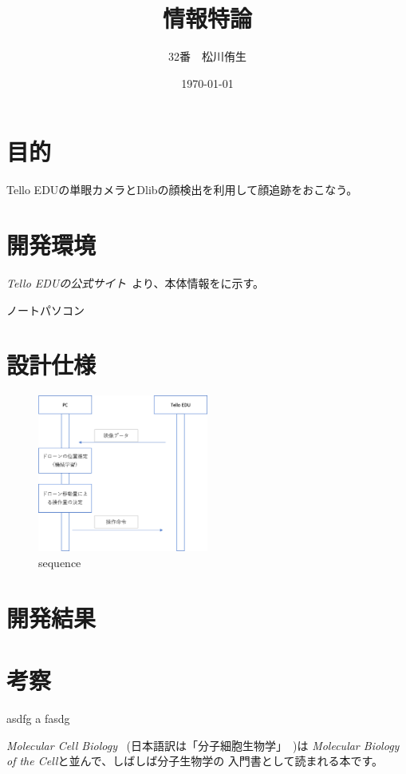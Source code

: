 \documentclass[uplatex]{jsarticle}
\title{情報特論}
\author{32番　松川侑生}
\date{\today}
\begin{document}
\maketitle
\section{目的}
    Tello EDUの単眼カメラとDlibの顔検出を利用して顔追跡をおこなう。
\section{開発環境}
    \textit{Tello EDUの公式サイト}~\cite{tello}より、本体情報をに示す。

    ノートパソコン\\
\section{設計仕様}
    \begin{figure}
        \begin{center}
        \includegraphics[width=0.5\textwidth]{sequence.png}
        \end{center}
        \caption{sequence}
    \end{figure}
    
\section{開発結果}
\section{考察}
asdfg a
fasdg

\textit{Molecular Cell Biology}~\cite{mcbe} (日本語訳は「分子細胞生物学」~\cite{mcb})は
\textit{Molecular Biology of the Cell}と並んで、しばしば分子生物学の
入門書として読まれる本です。



\end{document}
